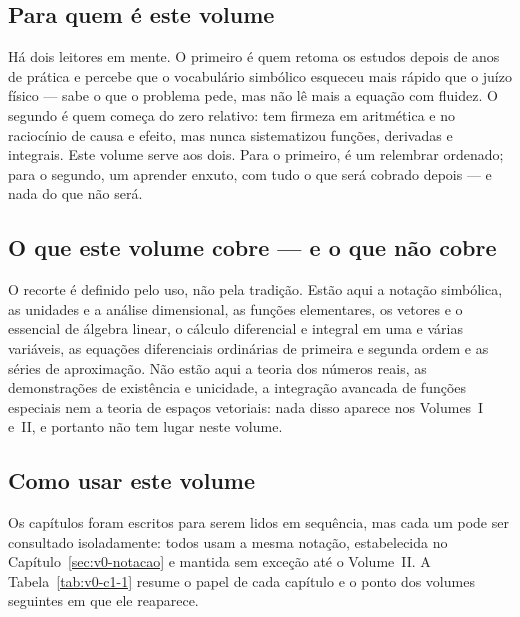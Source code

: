 \documentclass[12pt,a4paper]{article}
\numberwithin{equation}{section}
\numberwithin{table}{section}
\numberwithin{figure}{section}
\begin{document}
\subsection{Para quem é este volume}

Há dois leitores em mente. O primeiro é quem retoma os estudos depois de
anos de prática e percebe que o vocabulário simbólico esqueceu mais rápido
que o juízo físico --- sabe o que o problema pede, mas não lê mais a equação
com fluidez. O segundo é quem começa do zero relativo: tem firmeza em
aritmética e no raciocínio de causa e efeito, mas nunca sistematizou
funções, derivadas e integrais. Este volume serve aos dois. Para o primeiro,
é um relembrar ordenado; para o segundo, um aprender enxuto, com tudo o que
será cobrado depois --- e nada do que não será.

\subsection{O que este volume cobre --- e o que não cobre}

O recorte é definido pelo uso, não pela tradição. Estão aqui a notação
simbólica, as unidades e a análise dimensional, as funções elementares, os
vetores e o essencial de álgebra linear, o cálculo diferencial e integral em
uma e várias variáveis, as equações diferenciais ordinárias de primeira e
segunda ordem e as séries de aproximação. Não estão aqui a teoria dos
números reais, as demonstrações de existência e unicidade, a integração
avancada de funções especiais nem a teoria de espaços vetoriais: nada disso
aparece nos Volumes~I e~II, e portanto não tem lugar neste volume.

\subsection{Como usar este volume}

Os capítulos foram escritos para serem lidos em sequência, mas cada um pode
ser consultado isoladamente: todos usam a mesma notação, estabelecida no
Capítulo~\ref{sec:v0-notacao} e mantida sem exceção até o Volume~II. A
Tabela~\ref{tab:v0-c1-1} resume o papel de cada capítulo e o ponto dos
volumes seguintes em que ele reaparece.
\end{document}
